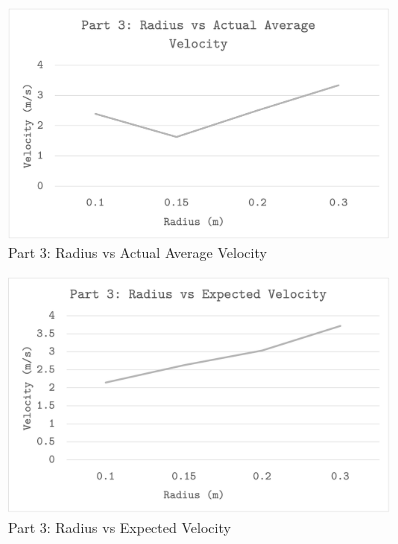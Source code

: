 \begin{figure}[H]
	\captionsetup{font=Large}
	\caption{Part 3: Radius vs Actual Average Velocity}
	\begin{center}
		\includegraphics[width=0.90\textwidth]{images/p3Actual}
	\end{center}
	\label{fig:p3Actual}
\end{figure}

\begin{figure}[H]
	\captionsetup{font=Large}
	\caption{Part 3: Radius vs Expected Velocity}
	\begin{center}
		\includegraphics[width=0.90\textwidth]{images/p3Expected}
	\end{center}
	\label{fig:p3Expected}
\end{figure}


\newpage

